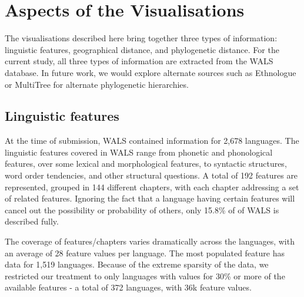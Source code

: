 \documentclass[11pt]{article}
\begin{document}
\section{Aspects of the Visualisations}

The visualisations described here bring together three types of information: linguistic features, geographical distance, and phylogenetic distance. For the current study, all three types of information are extracted from the WALS database. In future work, we would explore alternate sources such as Ethnologue \cite{ethnologue} or MultiTree  for alternate phylogenetic hierarchies. 

\subsection{Linguistic features}
At the time of submission, WALS contained information for 2,678 languages. The linguistic features covered in WALS range from phonetic and phonological features, over some lexical and morphological features, to syntactic structures, word order tendencies, and other structural questions. A total of 192 features are represented, grouped in 144 different chapters, with each chapter addressing a set of related features.  Ignoring the fact that a language having certain features will cancel out the possibility or probability of others, only 15.8\% of of WALS is described fully.

The coverage of features/chapters varies dramatically across the languages, with an average of 28 feature values per language. The most populated feature has data for 1,519 languages. Because of the extreme sparsity of the data, we restricted our treatment to only languages with values for 30\% or more of the available features - a total of 372 languages, with 36k feature values.
\end{document}
